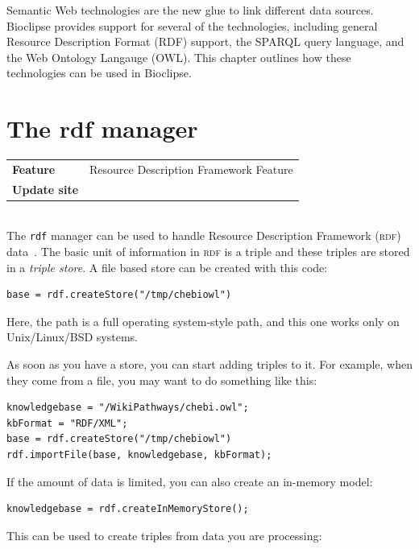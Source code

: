 \documentclass[a5paper, 10pt]{memoir}
\begin{document}
\begin{refsection}

Semantic Web technologies are the new glue to link different data sources. Bioclipse
provides support for several of the technologies, including general
Resource Description Format (RDF) support,
the SPARQL query language, and the Web Ontology Langauge
(OWL). This chapter outlines how these
technologies can be used in Bioclipse.

\section{The rdf manager}

\begin{tabular}{ll}
\textbf{Feature} & Resource Description Framework Feature \\
\textbf{Update site} & \url{} \\
\end{tabular} \\

\noindent
The \texttt{rdf} manager can be used to handle Resource Description Framework
(\textsc{rdf}) data~\cite{willighagen2011linking}. The basic unit of
information in \textsc{rdf} is a triple and these triples are stored in a
\emph{triple store}. A file based store can be created with this
code:

\begin{Verbatim}
base = rdf.createStore("/tmp/chebiowl")
\end{Verbatim}
Here, the path is a full operating system-style path, and this one works only
on Unix/Linux/BSD systems.

As soon as you have a store, you can start adding triples to it. For example,
when they come from a file, you may want to do something like
this:

\begin{Verbatim}
knowledgebase = "/WikiPathways/chebi.owl";
kbFormat = "RDF/XML";
base = rdf.createStore("/tmp/chebiowl")
rdf.importFile(base, knowledgebase, kbFormat);
\end{Verbatim}
If the amount of data is limited, you can also create an
in-memory model:

\begin{Verbatim}
knowledgebase = rdf.createInMemoryStore();
\end{Verbatim}
This can be used to create triples from data you are
processing:


\end{refsection}
\end{document}
